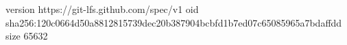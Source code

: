 version https://git-lfs.github.com/spec/v1
oid sha256:120c0664d50a8812815739dec20b387904bcbfd1b7ed07c65085965a7bdaffdd
size 65632
